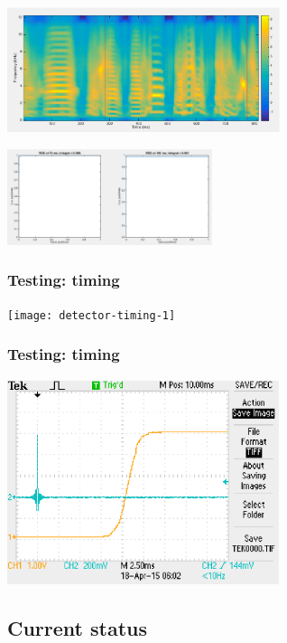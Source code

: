 \documentclass{beamer}
\begin{document}
\begin{frame}
  \begin{center}
    \includegraphics[width=8cm]{detector2-spectrogram}
  \end{center}
  \par
  \begin{center}
    \includegraphics[width=6cm]{detector2-roc}
  \end{center}
\end{frame}


\begin{frame}
  \frametitle{Testing: timing}
  \begin{center}
    \texttt{[image: detector-timing-1]}
  \end{center}
\end{frame}

\begin{frame}
  \frametitle{Testing: timing}
  \begin{center}
    \includegraphics[width=8cm]{detector-timing-2}
  \end{center}
\end{frame}

\subsection{Current status}
\end{document}
